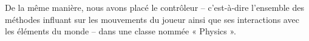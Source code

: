 
De la même manière, nous avons placé le contrôleur – c'est-à-dire l'ensemble des méthodes influant sur les mouvements du joueur ainsi que ses interactions avec les éléments du monde – dans une classe nommée « Physics ».